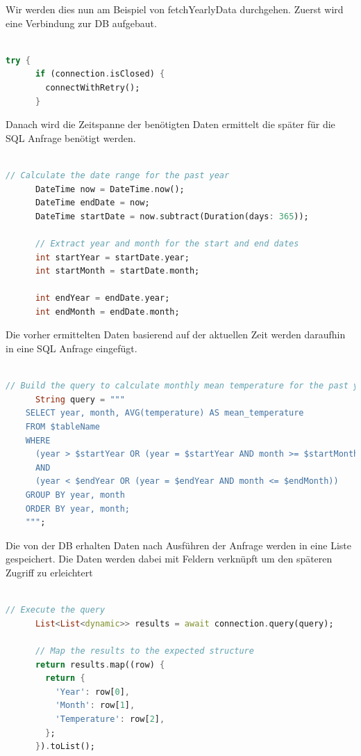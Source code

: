 \documentclass[11pt]{scrartcl}
\begin{document}
Wir werden dies nun am Beispiel von fetchYearlyData durchgehen.
Zuerst wird eine Verbindung zur DB aufgebaut.

\begin{lstlisting}[language=Dart]

try {
      if (connection.isClosed) {
        connectWithRetry();
      }

\end{lstlisting}

Danach wird die Zeitspanne der benötigten Daten ermittelt die später für die SQL Anfrage benötigt werden.

\begin{lstlisting}[language=Dart]

// Calculate the date range for the past year
      DateTime now = DateTime.now();
      DateTime endDate = now;
      DateTime startDate = now.subtract(Duration(days: 365));

      // Extract year and month for the start and end dates
      int startYear = startDate.year;
      int startMonth = startDate.month;

      int endYear = endDate.year;
      int endMonth = endDate.month;

\end{lstlisting}

Die vorher ermittelten Daten basierend auf der aktuellen Zeit werden daraufhin in eine SQL Anfrage eingefügt.

\begin{lstlisting}[language=Dart]

// Build the query to calculate monthly mean temperature for the past year
      String query = """
    SELECT year, month, AVG(temperature) AS mean_temperature
    FROM $tableName
    WHERE 
      (year > $startYear OR (year = $startYear AND month >= $startMonth))
      AND
      (year < $endYear OR (year = $endYear AND month <= $endMonth))
    GROUP BY year, month
    ORDER BY year, month;
    """;

\end{lstlisting}

Die von der DB erhalten Daten nach Ausführen der Anfrage werden in eine Liste gespeichert. Die Daten werden dabei mit Feldern verknüpft um den späteren Zugriff zu erleichtert

\begin{lstlisting}[language=Dart]

// Execute the query
      List<List<dynamic>> results = await connection.query(query);

      // Map the results to the expected structure
      return results.map((row) {
        return {
          'Year': row[0],
          'Month': row[1],
          'Temperature': row[2],
        };
      }).toList();

\end{lstlisting}
\end{document}
